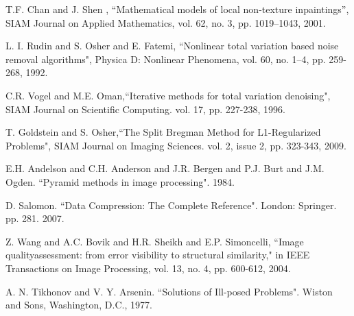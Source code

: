 

\begin{thebibliography}{}
	
	T.F. Chan and J. Shen , “Mathematical models of local non-texture inpaintings”, SIAM Journal on Applied Mathematics, vol. 62, no. 3, pp. 1019–1043, 2001. 
	
	L. I. Rudin and S. Osher and E. Fatemi, “Nonlinear total variation based noise removal algorithms", Physica D: Nonlinear Phenomena, vol. 60, no. 1–4, pp. 259-268, 1992. 
	
	C.R. Vogel and M.E. Oman,“Iterative methods for total variation denoising", SIAM Journal on Scientific Computing. vol. 17, pp. 227-238, 1996.
	
	T. Goldstein and S. Osher,“The Split Bregman Method for L1-Regularized Problems", SIAM Journal on Imaging Sciences. vol. 2, issue 2, pp. 323-343, 2009.
	
	E.H. Andelson and C.H. Anderson and J.R. Bergen and P.J. Burt and J.M. Ogden. “Pyramid methods in image processing". 1984.
	
	D. Salomon. “Data Compression: The Complete Reference". London: Springer. pp. 281. 2007.
	
	Z. Wang and A.C. Bovik and H.R. Sheikh and E.P. Simoncelli, “Image qualityassessment: from error visibility to structural similarity," in IEEE Transactions on Image Processing, vol. 13, no. 4, pp. 600-612, 2004.

	A. N. Tikhonov and V. Y. Arsenin. “Solutions of Ill-posed Problems". Wiston and Sons, Washington, D.C., 1977.



\end{thebibliography}
\clearpage